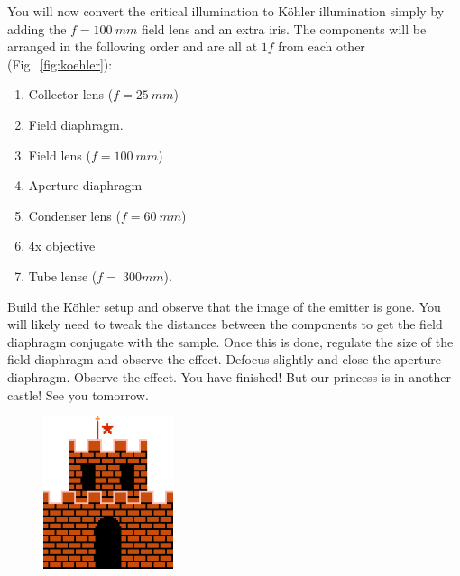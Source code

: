 \documentclass[a4paper]{report}
\newcommand{\nexercise}[0]{\arabic{exercises}\addtocounter{exercises}{1}}
\begin{document}
\clearpage
\begin{exercisebox}[frametitle={Exercise \nexercise: K\"{o}hler illumination}]
You will now convert the critical illumination to K\"{o}hler illumination simply by adding the $f=100~mm$ field lens and an extra iris.
The components will be arranged in the following order and are all at $1f$ from each other (Fig.~\ref{fig:koehler}):
\begin{enumerate}
\setlength\itemsep{0.1em}
\item Collector lens ($f=25~mm$)
\item Field diaphragm.
\item Field lens ($f=100~mm$)
\item Aperture diaphragm
\item Condenser lens ($f=60~mm$)
\item 4x objective
\item Tube lense ($f=~300mm$).
\end{enumerate}

Build the K\"{o}hler setup and observe that the image of the emitter is gone. 
You will likely need to tweak the distances between the components to get the field diaphragm conjugate with the sample. 
Once this is done, regulate the size of the field diaphragm and observe the effect. 
Defocus slightly and close the aperture diaphragm. Observe the effect.
You have finished! But our princess is in another castle! See you tomorrow. 
\end{exercisebox}

\begin{figure}[b]
\begin{flushright}
	\includegraphics[width=1.5in]{castle.png}	
\end{flushright}
\end{figure}

\end{document}
